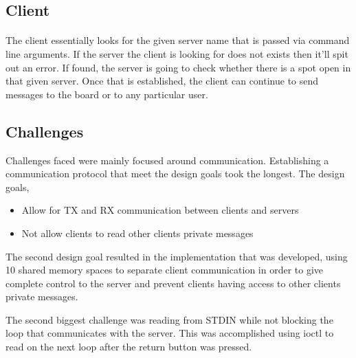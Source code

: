 \documentclass{article}
\begin{document}
\subsection{Client}

\paragraph{}
The client essentially looks for the given server name that is passed via command line arguments. If the server the client is looking for does not exists then it'll spit out an error. If found, the server is going to check whether there is a spot open in that given server. Once that is established, the client can continue to send messages to the board or to any particular user. 

\subsection{Challenges}

Challenges faced were mainly focused around communication. Establishing a communication protocol that meet the design goals took the longest. The design goals,

\begin{itemize}
    \item Allow for TX and RX communication between clients and servers
    \item Not allow clients to read other clients private messages
\end{itemize}

The second design goal resulted in the implementation that was developed, using 10 shared memory spaces to separate client communication in order to give complete control to the server and prevent clients having access to other clients private messages.

The second biggest challenge was reading from STDIN while not blocking the loop that communicates with the server. This was accomplished using ioctl to read on the next loop after the return button was pressed.
\end{document}
